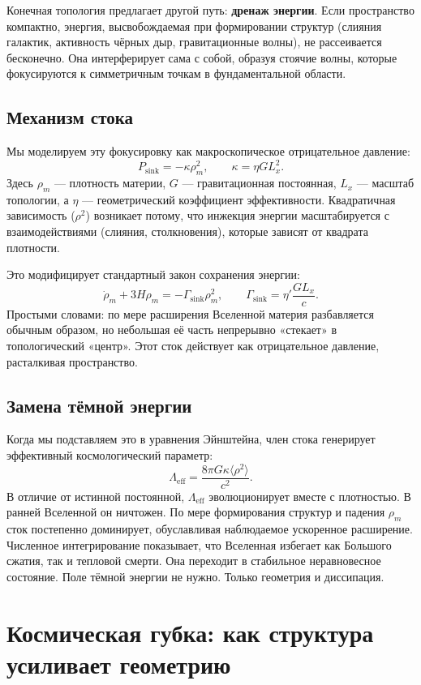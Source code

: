 \documentclass[12pt,a4paper]{report}
\begin{document}
Конечная топология предлагает другой путь: \textbf{дренаж энергии}. Если пространство компактно, энергия, высвобождаемая при формировании структур (слияния галактик, активность чёрных дыр, гравитационные волны), не рассеивается бесконечно. Она интерферирует сама с собой, образуя стоячие волны, которые фокусируются к симметричным точкам в фундаментальной области.

\section{Механизм стока}
Мы моделируем эту фокусировку как макроскопическое отрицательное давление:
$$
P_{\mathrm{sink}} = -\kappa \rho_m^2, \qquad \kappa = \eta G L_x^2.
$$
Здесь $\rho_m$ — плотность материи, $G$ — гравитационная постоянная, $L_x$ — масштаб топологии, а $\eta$ — геометрический коэффициент эффективности. Квадратичная зависимость ($\rho^2$) возникает потому, что инжекция энергии масштабируется с взаимодействиями (слияния, столкновения), которые зависят от квадрата плотности.

Это модифицирует стандартный закон сохранения энергии:
$$
\dot{\rho}_m + 3H\rho_m = -\Gamma_{\mathrm{sink}}\rho_m^2, \qquad \Gamma_{\mathrm{sink}} = \eta' \frac{G L_x}{c}.
$$
Простыми словами: по мере расширения Вселенной материя разбавляется обычным образом, но небольшая её часть непрерывно «стекает» в топологический «центр». Этот сток действует как отрицательное давление, расталкивая пространство.

\section{Замена тёмной энергии}
Когда мы подставляем это в уравнения Эйнштейна, член стока генерирует эффективный космологический параметр:
$$
\Lambda_{\mathrm{eff}} = \frac{8\pi G \kappa \langle \rho^2 \rangle}{c^2}.
$$
В отличие от истинной постоянной, $\Lambda_{\mathrm{eff}}$ эволюционирует вместе с плотностью. В ранней Вселенной он ничтожен. По мере формирования структур и падения $\rho_m$ сток постепенно доминирует, обуславливая наблюдаемое ускоренное расширение. Численное интегрирование показывает, что Вселенная избегает как Большого сжатия, так и тепловой смерти. Она переходит в стабильное неравновесное состояние. Поле тёмной энергии не нужно. Только геометрия и диссипация.



\chapter{Космическая губка: как структура усиливает геометрию}
\end{document}
